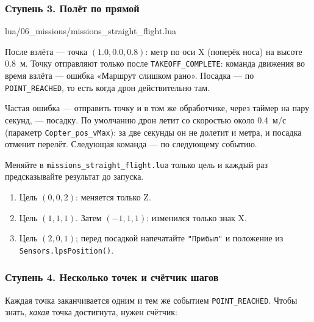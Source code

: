 \subsubsection*{Ступень 3. Полёт по прямой}

\begin{codefile}{lua/06_missions/missions_straight_flight.lua}
\end{codefile}

После взлёта --- точка $(1.0, 0.0, 0.8)$: метр по оси X (поперёк носа) на высоте 0.8~м. Точку отправляют только после \verb|TAKEOFF_COMPLETE|: команда движения во время взлёта --- ошибка «Маршрут слишком рано». Посадка --- по \verb|POINT_REACHED|, то есть когда дрон действительно там.

\begin{warnbox}
Частая ошибка --- отправить точку и в том же обработчике, через таймер на пару секунд, --- посадку. По умолчанию дрон летит со скоростью около 0.4~м/с (параметр \verb|Copter_pos_vMax|): за две секунды он не долетит и метра, и посадка отменит перелёт. Следующая команда --- по следующему событию.
\end{warnbox}

\begin{taskbox}
Меняйте в \texttt{missions\_straight\_flight.lua} только цель и каждый раз предсказывайте результат до запуска.
\begin{enumerate}
  \item Цель $(0, 0, 2)$: меняется только Z.
  \item Цель $(1, 1, 1)$. Затем $(-1, 1, 1)$: изменился только знак X.
  \item Цель $(2, 0, 1)$; перед посадкой напечатайте \verb|"Прибыл"| и положение из \verb|Sensors.lpsPosition()|.
\end{enumerate}
\end{taskbox}

\subsubsection*{Ступень 4. Несколько точек и счётчик шагов}

Каждая точка заканчивается одним и тем же событием \verb|POINT_REACHED|. Чтобы знать, \emph{какая} точка достигнута, нужен счётчик:

